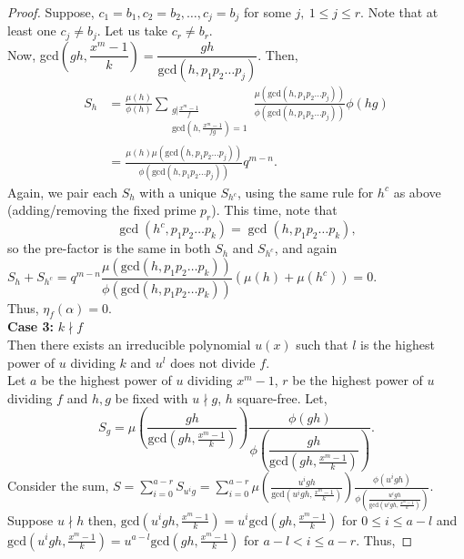 \documentclass[10pt,a4paper]{amsart}
\begin{document}
\begin{proof}
        Suppose, $c_1=b_1, c_2 = b_2, \dots, c_j=b_j$ for some $j,~1\leq j \leq r$. Note that at least one $c_j \neq b_j$. Let us take $c_r \neq b_r$. \\
        Now, gcd$\left( gh , \dfrac{x^m-1}{k}\right) = \dfrac{gh}{\text{gcd}(h,p_1p_2\dots p_j)}$. Then,
        \begin{align*}
            S_h &= \frac{\mu(h)}{\phi(h)} \sum_{\substack{g\vert \frac{x^m-1}{f}\\\text{gcd}(h,\frac{x^m-1}{fg})=1}} \frac{\mu(\text{gcd}(h,p_1p_2\dots p_j))}{\phi(\text{gcd}(h,p_1p_2\dots p_j))} \phi(hg) \\
            &= \frac{\mu(h)\mu(\text{gcd}(h,p_1p_2\dots p_j))}{\phi(\text{gcd}(h,p_1p_2\dots p_j))}q^{m-n}.
        \end{align*}
        Again, we pair each $S_h$ with a unique $S_{h^c}$, using the same rule for $h^c$ as above (adding/removing the fixed prime $p_r$). This time, note that
        \[
        \gcd(h^c, p_1p_2\dots p_k) = \gcd(h, p_1p_2\dots p_k),
        \]
        so the pre-factor is the same in both $S_h$ and $S_{h^c}$, and again\\
        $S_h + S_{h^c} = q^{m-n} \dfrac{\mu(\text{gcd}(h,p_1p_2\dots p_k))}{\phi(\text{gcd}(h,p_1p_2\dots p_k))} (\mu(h)+\mu(h^c)) = 0$.\\
        Thus, $\eta_f(\alpha) = 0$.\\
        \textbf{Case 3:} $k \nmid f$\\
        Then there exists an irreducible polynomial $u(x)$ such that $l$ is the highest power of $u$ dividing $k$ and $u^l$ does not divide $f$.\\
        Let $a$ be the highest power of $u$ dividing $x^m-1$, $r$ be the highest power of $u$ dividing $f$ and $h, g$ be fixed with $u \nmid g$, $h$  square-free. Let,
        $$S_g = \mu\left(\dfrac{gh}{\text{gcd}(gh,\frac{x^m-1}{k})}\right)\dfrac{\phi(gh)}{\phi\left(\dfrac{gh}{\text{gcd}(gh,\frac{x^m-1}{k})}\right)}.$$
        Consider the sum, $S = \displaystyle \sum_{i=0}^{a-r}S_{u^ig} = \sum_{i=0}^{a-r} \mu\left(\frac{u^igh}{\text{gcd}(u^igh,\frac{x^m-1}{k})}\right)\frac{\phi(u^igh)}{\phi\left(\frac{u^igh}{\text{gcd}(u^igh,\frac{x^m-1}{k})}\right)}$. \\
        Suppose $u\nmid h$ then,  $\text{gcd}(u^igh,\frac{x^m-1}{k}) = u^i \text{gcd}(gh,\frac{x^m-1}{k})$ for $0 \leq i \leq a-l$ and $\text{gcd}(u^igh,\frac{x^m-1}{k}) = u^{a-l} \text{gcd}(gh,\frac{x^m-1}{k})$ for $a-l < i \leq a-r$. Thus,
        

\end{proof}
\end{document}
